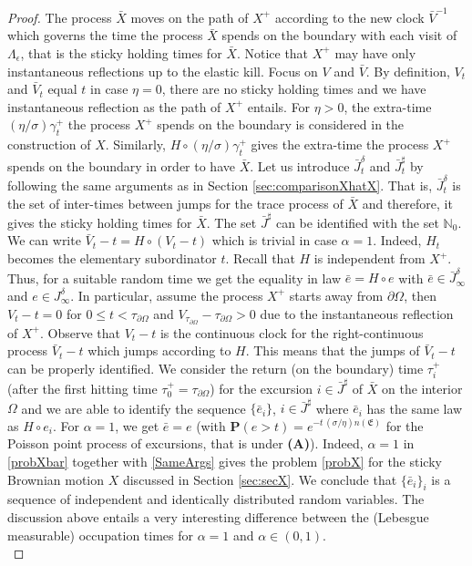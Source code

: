 \documentclass[11pt,a4paper]{article}
\begin{document}
\begin{proof}
The process $\bar{X}$ moves on the path of $X^+$ according to the new clock $\bar{V}^{-1}$ which governs the time the process $\bar{X}$  spends on the boundary with each visit of $\Lambda_\epsilon$, that is the  sticky holding times for $\bar{X}$. Notice that $X^+$ may have only instantaneous reflections up to the elastic kill. Focus on $V$ and $\bar{V}$. By definition, $V_t$ and $\bar{V}_t$ equal $t$ in case $\eta=0$, there are no sticky holding times and we have instantaneous reflection as the path of $X^+$ entails. For $\eta>0$, the extra-time $(\eta/\sigma)\gamma^+_t$ the process $X^+$ spends on the boundary is considered in the construction of $X$. Similarly, $H \circ (\eta/\sigma) \gamma^+_t$ gives the extra-time the process $X^+$ spends on the boundary in order to have $\bar{X}$. Let us introduce $\bar{J}^\delta_t$ and $\bar{J}^\sharp_t$ by following the same arguments as in Section \ref{sec:comparisonXhatX}. That is, $\bar{J}^\delta_t$ is the set of inter-times between jumps for the trace process of $\bar{X}$ and therefore, it gives the  sticky holding times for $\bar{X}$. The set $\bar{J}^\sharp$ can be identified with the set $\mathbb{N}_0$. We can write $\bar{V}_t - t = H \circ (V_t - t)$ which is trivial in case $\alpha=1$. Indeed, $H_t$ becomes the elementary subordinator $t$. Recall that $H$ is independent from $X^+$. Thus, for a suitable random time we get the equality in law $\bar{e} = H \circ e$ with $\bar{e} \in \bar{J}^\delta_\infty$ and $e \in J^\delta_\infty$. In particular, assume the process $X^+$ starts away from $\partial \Omega$, then $V_{t} - t = 0$ for $0\leq t < \tau_{\partial \Omega}$ and $V_{\tau_{\partial \Omega}} - \tau_{\partial \Omega} > 0$ due to the instantaneous reflection of $X^+$. Observe that $V_t - t$ is the continuous clock for the right-continuous process $\bar{V}_t - t$ which jumps according to $H$. This means that the jumps of $\bar{V}_t - t$ can be properly identified. We consider the return (on the boundary) time $\tau^+_i$ (after the first hitting time $\tau^+_0=\tau_{\partial \Omega}$) for the excursion $i \in \bar{J}^\sharp$ of $\bar{X}$ on the interior $\Omega$ and we are able to identify the sequence $\{\bar{e}_i\}$, $i \in \bar{J}^\sharp$ where $\bar{e}_i$ has the same law as $H \circ e_i$. For $\alpha=1$, we get $\bar{e} = e$ (with $\mathbf{P}(e >t) =e^{-t\, (\sigma/\eta) n(\mathfrak{E}) }$ for the Poisson point process of excursions, that is under {\bf (A)}). Indeed, $\alpha=1$ in \eqref{probXbar} together with \eqref{SameArgs} gives the problem \eqref{probX} for the sticky Brownian motion $X$ discussed in Section \ref{sec:secX}. We conclude that $\{\bar{e}_i\}_i$ is a sequence of independent and identically distributed random variables. The discussion above entails a very interesting difference between the (Lebesgue measurable) occupation times for $\alpha=1$ and $\alpha \in (0,1)$.\\ 


\end{proof}
\end{document}
